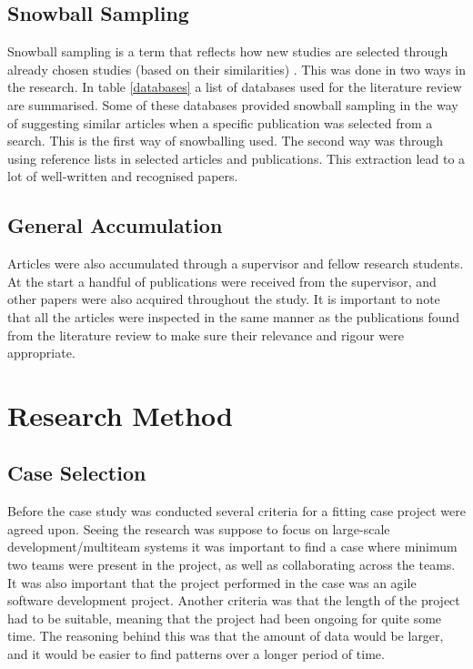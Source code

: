 \subsection{Snowball Sampling}

Snowball sampling is a term that reflects how new studies are selected through already chosen studies (based on their similarities) \cite{Goodman1961}. This was done in two ways in the research. In table \ref{databases} a list of databases used for the literature review are summarised. Some of these databases provided snowball sampling in the way of suggesting similar articles when a specific publication was selected from a search. This is the first way of snowballing used. The second way was through using reference lists in selected articles and publications. This extraction lead to a lot of well-written and recognised papers.

\subsection{General Accumulation}
\label{general}

Articles were also accumulated through a supervisor and fellow research students. At the start a handful of publications were received from the supervisor, and other papers were also acquired throughout the study. It is important to note that all the articles were inspected in the same manner as the publications found from the literature review to make sure their relevance and rigour were appropriate.

\section{Research Method}




\subsection{Case Selection}
\label{case_selection}

Before the case study was conducted several criteria for a fitting case project were agreed upon. Seeing the research was suppose to focus on large-scale development/multiteam systems it was important to find a case where minimum two teams were present in the project, as well as collaborating across the teams. It was also important that the project performed in the case was an agile software development project. Another criteria was that the length of the project had to be suitable, meaning that the project had been ongoing for quite some time. The reasoning behind this was that the amount of data would be larger, and it would be easier to find patterns over a longer period of time.

